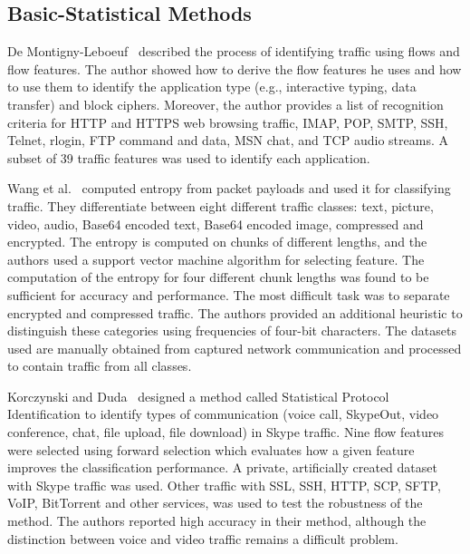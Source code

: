 \subsection{Basic-Statistical Methods}\label{subsec:basic-statistical}

De Montigny-Leboeuf~\cite{DeMontigny-Leboeuf-2005-Flow} described the process of identifying traffic using flows and flow features. The author showed how to derive the flow features he uses and how to use them to identify the application type (e.g., interactive typing, data transfer) and block ciphers. Moreover, the author provides a list of recognition criteria for HTTP and HTTPS web browsing traffic, IMAP, POP, SMTP, SSH, Telnet, rlogin, FTP command and data, MSN chat, and TCP audio streams. A subset of 39 traffic features was used to identify each application.

Wang et al.~\cite{Wang-2011-Using} computed entropy from packet payloads and used it for classifying traffic. They differentiate between eight different traffic classes: text, picture, video, audio, Base64 encoded text, Base64 encoded image, compressed and encrypted. The entropy is computed on chunks of different lengths, and the authors used a support vector machine algorithm for selecting feature. The computation of the entropy for four different chunk lengths was found to be sufficient for accuracy and performance. The most difficult task was to separate encrypted and compressed traffic. The authors provided an additional heuristic to distinguish these categories using frequencies of four-bit characters. The datasets used are manually obtained from captured network communication and processed to contain traffic from all classes.

Korczynski and Duda~\cite{Korczynski-2012-Classifying} designed a method called Statistical Protocol Identification to identify types of communication (voice call, SkypeOut, video conference, chat, file upload, file download) in Skype traffic. Nine flow features were selected using forward selection which evaluates how a given feature improves the classification performance. A private, artificially created dataset with Skype traffic was used. Other traffic with SSL, SSH, HTTP, SCP, SFTP, VoIP, BitTorrent and other services, was used to test the robustness of the method. The authors reported high accuracy in their method, although the distinction between voice and video traffic remains a difficult problem.

